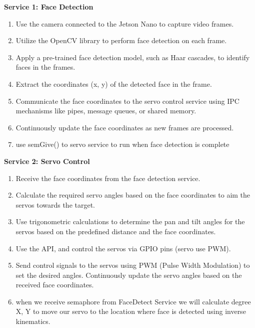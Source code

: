 \documentclass[a4paper,11pt]{article}%
\newenvironment{qanda}{\setlength{\parindent}{0pt}}{\bigskip}
\begin{document}
\begin{qanda}
\begin{enumerate}
\begin{enumerate}
				      \textbf{Service 1: Face Detection}
				      \begin{enumerate}
					      \item Use the camera connected to the Jetson Nano to capture video frames.
					      \item Utilize the OpenCV library to perform face detection on each frame.
					      \item Apply a pre-trained face detection model, such as Haar cascades, to identify faces in the frames.
					      \item Extract the coordinates (x, y) of the detected face in the frame.
					      \item Communicate the face coordinates to the servo control service using IPC mechanisms like pipes, message queues, or shared memory.
					      \item Continuously update the face coordinates as new frames are processed.
					      \item use semGive() to servo service to run when face detection is complete
				      \end{enumerate}

				      \textbf{Service 2: Servo Control}
				      \begin{enumerate}
					      \item Receive the face coordinates from the face detection service.
					      \item Calculate the required servo angles based on the face coordinates to aim the servos towards the target.
					      \item Use trigonometric calculations to determine the pan and tilt angles for the servos based on the predefined distance and the face coordinates.
					      \item Use the API, and control the servos via GPIO pins (servo use PWM).
					      \item Send control signals to the servos using PWM (Pulse Width Modulation) to set the desired angles.
					            Continuously update the servo angles based on the received face coordinates.
					      \item when we receive semaphore from FaceDetect Service we will calculate degree X, Y to move our servo to the location where face is detected using inverse kinematics.
				      \end{enumerate}



\end{enumerate}
\end{enumerate}
\end{qanda}
\end{document}
